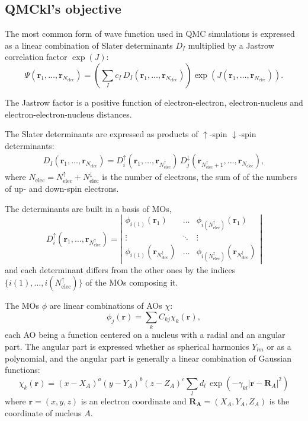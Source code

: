 \subsection{QMCkl's objective}

\newcommand{\Nelec}{N_{\text{elec}}}
\newcommand{\Nelecup}{N_{\text{elec}}^\uparrow}
\newcommand{\Nelecdn}{N_{\text{elec}}^\downarrow}
\newcommand{\br}{\mathbf{r}_1,\dots,\mathbf{r}_{\Nelec}}
\newcommand{\brup}{\mathbf{r}_1,\dots,\mathbf{r}_{\Nelec^\uparrow}}
\newcommand{\brdn}{\mathbf{r}_{\Nelec^\uparrow+1},\dots,\mathbf{r}_{\Nelec}}

The most common form of wave function used in \ac{QMC} simulations is
expressed as a linear combination of Slater determinants $D_I$ multiplied by
a Jastrow correlation factor $\exp(J)$:
\begin{equation}
  \Psi(\br) = \left( \sum_I c_I\, D_I(\br) \right) \exp \left( J(\br) \right).
\end{equation}

The Jastrow factor is a positive function of electron-electron,
electron-nucleus and electron-electron-nucleus distances. 

The Slater determinants are expressed as products of $\uparrow$-spin
$\downarrow$-spin determinants:
\begin{eqnarray}
D_I(\br) = D_i^\uparrow(\brup)\, D_j^\downarrow(\brdn),
\end{eqnarray}
where $\Nelec = \Nelecup + \Nelecdn$ is the number of
electrons, the sum of of the numbers of up- and down-spin electrons.

The determinants are built in a basis of \acp{MO},
\begin{equation}
  D_i^\uparrow(\brup) = \left|
    \begin{array}{ccc}
      \phi_{i(1)}(\mathbf{r}_1) & \dots & \phi_{i(\Nelecup)}(\mathbf{r}_1) \\
        \vdots & \ddots & \vdots \\
      \phi_{i(1)}(\mathbf{r}_{\Nelecup}) & \dots & \phi_{i(\Nelecup)}(\mathbf{r}_{\Nelecup}) 
    \end{array}
    \right|
\end{equation}
and each determinant differs from the other ones by the indices $\{
i(1), \dots, i(\Nelecup) \}$ of the \acp{MO} composing it.

The \acp{MO} $\phi$ are linear combinations of \acp{AO} $\chi$:
\begin{equation}
\phi_j(\mathbf{r}) = \sum_k C_{kj} \chi_k(\mathbf{r}),
\end{equation}
each \ac{AO} being a function centered on a nucleus with a radial and an angular part.
The angular part is expressed whether as spherical harmonics $Y_{lm}$ or as a polynomial, and
the angular part is generally a linear combination of Gaussian functions:
\begin{equation}
\chi_k(\mathbf{r}) = (x-X_A)^a (y-Y_A)^b (z-Z_A)^c \sum_l d_l\, \exp \left(
    -\gamma_{kl} |\mathbf{r}-\mathbf{R}_A|^2 \right)
\end{equation}
where $\mathbf{r} = (x,y,z)$ is an electron coordinate and 
$\mathbf{R_A} = (X_A,Y_A,Z_A)$ is the coordinate of nucleus $A$.

